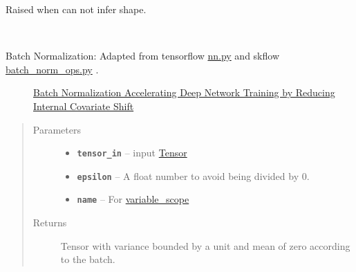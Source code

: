 \documentclass[letterpaper,10pt,english]{sphinxmanual}
\begin{document}
\begin{fulllineitems}
\label{node_ops:node_ops.MissingShapeError}
Raised when {\hyperref[node_ops:node_ops.placeholder]{\emph{}}} can not infer shape.

\end{fulllineitems}


\begin{fulllineitems}
\label{node_ops:node_ops.accuracy}
\end{fulllineitems}


\begin{fulllineitems}
\label{node_ops:node_ops.batch_normalize}~\begin{description}
\item[{Batch Normalization: Adapted from tensorflow \href{https://github.com/tensorflow/tensorflow/blob/master/tensorflow/python/ops/nn.py}{nn.py} and skflow \href{https://github.com/tensorflow/skflow/blob/master/skflow/ops/batch\_norm\_ops.py}{batch\_norm\_ops.py} .}] \leavevmode
\href{http://arxiv.org/pdf/1502.03167v3.pdf}{Batch Normalization Accelerating Deep Network Training by Reducing Internal Covariate Shift}

\end{description}
\begin{quote}\begin{description}
\item[{Parameters}] \leavevmode\begin{itemize}
\item {} 
\textbf{\texttt{tensor\_in}} -- input \href{https://www.tensorflow.org/versions/r0.7/api\_docs/python/framework.html\#Tensor}{Tensor}

\item {} 
\textbf{\texttt{epsilon}} -- A float number to avoid being divided by 0.

\item {} 
\textbf{\texttt{name}} -- For \href{https://www.tensorflow.org/versions/r0.7/how\_tos/variable\_scope/index.html}{variable\_scope}

\end{itemize}

\item[{Returns}] \leavevmode
Tensor with variance bounded by a unit and mean of zero according to the batch.

\end{description}\end{quote}

\end{fulllineitems}
\end{document}
